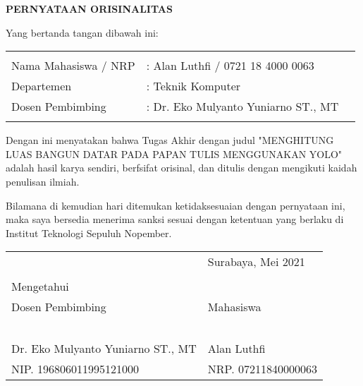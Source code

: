 \begin{center}
  \large
  \textbf{PERNYATAAN ORISINALITAS}
\end{center}

\thispagestyle{empty}

\vspace{2ex}


\noindent Yang bertanda tangan dibawah ini:

\noindent\begin{tabularx}{\textwidth}{X X l}
  & \\
  Nama Mahasiswa / NRP &: Alan Luthfi / 0721 18 4000 0063 \\
  Departemen &: Teknik Komputer \\
  Dosen Pembimbing &: Dr. Eko Mulyanto Yuniarno ST., MT \\
  & \\
\end{tabularx}

Dengan ini menyatakan bahwa Tugas Akhir dengan judul "MENGHITUNG LUAS BANGUN DATAR PADA PAPAN TULIS MENGGUNAKAN YOLO" adalah hasil karya sendiri, berfsifat orisinal, dan ditulis dengan mengikuti kaidah penulisan ilmiah.

Bilamana di kemudian hari ditemukan ketidaksesuaian dengan pernyataan ini, maka saya bersedia menerima sanksi sesuai dengan ketentuan yang berlaku di Institut Teknologi Sepuluh Nopember.

\vspace{8ex}

\noindent\begin{tabularx}{\textwidth}{X l}
  & Surabaya, Mei 2021\\
  & \\
  Mengetahui & \\
  Dosen Pembimbing & Mahasiswa\\
  & \\
  & \\
  & \\
  & \\
  & \\
  Dr. Eko Mulyanto Yuniarno ST., MT & Alan Luthfi \\
  NIP. 196806011995121000 & NRP. 07211840000063 \\
\end{tabularx}